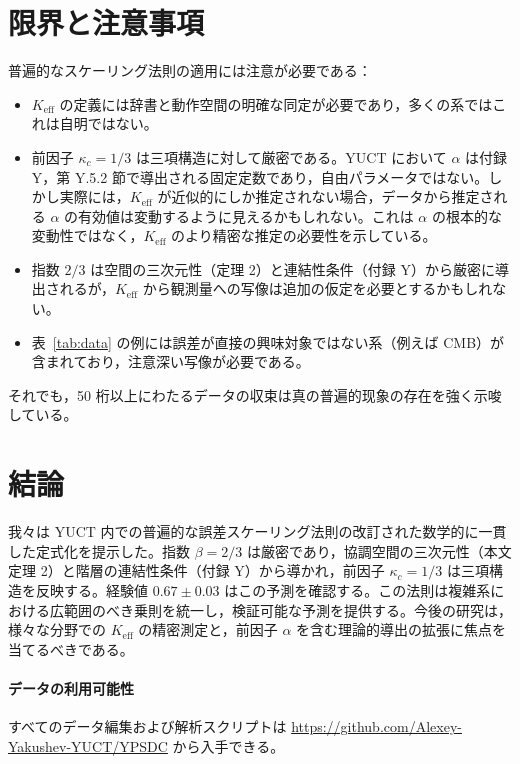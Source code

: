 \documentclass[11pt,a4paper]{article}
\newcommand{\Keff}{K_{\mathrm{eff}}}
\newcommand{\kappac}{\kappa_c}
\begin{document}
	\section{限界と注意事項}
	\label{sec:limitations}
	
	普遍的なスケーリング法則の適用には注意が必要である：
	\begin{itemize}
		\item \(\Keff\) の定義には辞書と動作空間の明確な同定が必要であり，多くの系ではこれは自明ではない。
		\item 前因子 \(\kappac = 1/3\) は三項構造に対して厳密である。YUCT において \(\alpha\) は付録 Y，第 Y.5.2 節で導出される固定定数であり，自由パラメータではない。しかし実際には，\(\Keff\) が近似的にしか推定されない場合，データから推定される \(\alpha\) の有効値は変動するように見えるかもしれない。これは \(\alpha\) の根本的な変動性ではなく，\(\Keff\) のより精密な推定の必要性を示している。
		\item 指数 \(2/3\) は空間の三次元性（定理 2）と連結性条件（付録 Y）から厳密に導出されるが，\(\Keff\) から観測量への写像は追加の仮定を必要とするかもしれない。
		\item 表~\ref{tab:data} の例には誤差が直接の興味対象ではない系（例えば CMB）が含まれており，注意深い写像が必要である。
	\end{itemize}
	
	それでも，50 桁以上にわたるデータの収束は真の普遍的现象の存在を強く示唆している。
	
	\section{結論}
	我々は YUCT 内での普遍的な誤差スケーリング法則の改訂された数学的に一貫した定式化を提示した。指数 \(\beta = 2/3\) は厳密であり，協調空間の三次元性（本文定理 2）と階層の連結性条件（付録 Y）から導かれ，前因子 \(\kappac = 1/3\) は三項構造を反映する。経験値 \(0.67 \pm 0.03\) はこの予測を確認する。この法則は複雑系における広範囲のべき乗則を統一し，検証可能な予測を提供する。今後の研究は，様々な分野での \(\Keff\) の精密測定と，前因子 \(\alpha\) を含む理論的導出の拡張に焦点を当てるべきである。
	
	\paragraph*{データの利用可能性}
	すべてのデータ編集および解析スクリプトは \url{https://github.com/Alexey-Yakushev-YUCT/YPSDC} から入手できる。
	
\end{document}
